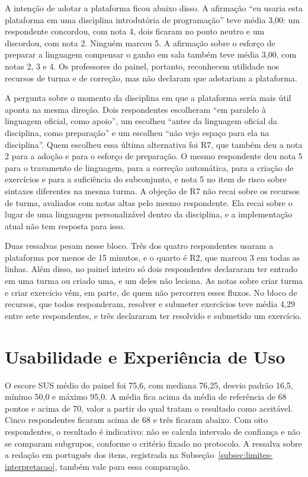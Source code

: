 A intenção de adotar a plataforma ficou abaixo disso. A afirmação ``eu usaria esta plataforma em uma disciplina introdutória de programação'' teve média 3,00: um respondente concordou, com nota 4, dois ficaram no ponto neutro e um discordou, com nota 2. Ninguém marcou 5. A afirmação sobre o esforço de preparar a linguagem compensar o ganho em sala também teve média 3,00, com notas 2, 3 e 4. Os professores do painel, portanto, reconhecem utilidade nos recursos de turma e de correção, mas não declaram que adotariam a plataforma.

A pergunta sobre o momento da disciplina em que a plataforma seria mais útil aponta na mesma direção. Dois respondentes escolheram ``em paralelo à linguagem oficial, como apoio'', um escolheu ``antes da linguagem oficial da disciplina, como preparação'' e um escolheu ``não vejo espaço para ela na disciplina''. Quem escolheu essa última alternativa foi R7, que também deu a nota 2 para a adoção e para o esforço de preparação. O mesmo respondente deu nota 5 para o travamento de linguagem, para a correção automática, para a criação de exercícios e para a suficiência do subconjunto, e nota 5 no item de risco sobre sintaxes diferentes na mesma turma. A objeção de R7 não recai sobre os recursos de turma, avaliados com notas altas pelo mesmo respondente. Ela recai sobre o lugar de uma linguagem personalizável dentro da disciplina, e a implementação atual não tem resposta para isso.

Duas ressalvas pesam nesse bloco. Três dos quatro respondentes usaram a plataforma por menos de 15 minutos, e o quarto é R2, que marcou 3 em todas as linhas. Além disso, no painel inteiro só dois respondentes declararam ter entrado em uma turma ou criado uma, e um deles não leciona. As notas sobre criar turma e criar exercício vêm, em parte, de quem não percorreu esses fluxos. No bloco de recursos, que todos responderam, resolver e submeter exercícios teve média 4,29 entre sete respondentes, e três declararam ter resolvido e submetido um exercício.

\section{Usabilidade e Experiência de Uso}
\label{sec:resultado-usabilidade}

O escore SUS médio do painel foi 75,6, com mediana 76,25, desvio padrão 16,5, mínimo 50,0 e máximo 95,0. A média fica acima da média de referência de 68 pontos \cite{sauro2012} e acima de 70, valor a partir do qual  tratam o resultado como aceitável. Cinco respondentes ficaram acima de 68 e três ficaram abaixo. Com oito respondentes, o resultado é indicativo: não se calcula intervalo de confiança e não se comparam subgrupos, conforme o critério fixado no protocolo. A ressalva sobre a redação em português dos itens, registrada na Subseção~\ref{subsec:limites-interpretacao}, também vale para essa comparação.

